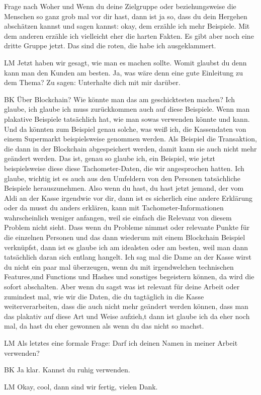 \begin{xlist}
Frage nach Woher und Wenn du deine Zielgruppe oder beziehungsweise die Menschen so ganz grob mal vor dir hast, dann ist ja so, dass du dein Hergehen abschätzen kannst und sagen kannst: okay, dem erzähle ich mehr Beispiele. Mit dem anderen erzähle ich vielleicht eher die harten Fakten. Es gibt aber noch eine dritte Gruppe jetzt. Das sind die roten, die habe ich ausgeklammert.
    \item[LM] Jetzt haben wir gesagt, wie man es machen sollte. Womit glaubst du denn kann man den Kunden am besten. Ja, was wäre denn eine gute Einleitung zu dem Thema? Zu sagen: Unterhalte dich mit mir darüber.
    \item[BK] Über Blockchain? Wie könnte man das am geschicktesten machen? Ich glaube, ich glaube ich muss zurückkommen auch auf diese Beispiele. Wenn man plakative Beispiele tatsächlich hat, wie man sowas verwenden könnte und kann. Und da könnten zum Beispiel genau solche, was weiß ich, die Kassendaten von einem Supermarkt beispielsweise genommen werden. Als Beispiel die Transaktion, die dann in der Blockchain abgespeichert werden, damit kann sie auch nicht mehr geändert werden. Das ist, genau so glaube ich, ein Beispiel, wie jetzt beispielsweise diese diese Tachometer-Daten, die wir angesprochen hatten. Ich glaube, wichtig ist es auch aus den Umfeldern von den Personen tatsächliche Beispiele herauszunehmen. Also wenn du hast, du hast jetzt jemand, der vom Aldi an der Kasse irgendwie vor dir, dann ist es sicherlich eine andere Erklärung oder da musst du anders erklären, kann mit Tachometer-Informationen wahrscheinlich weniger anfangen, weil sie einfach die Relevanz von diesem Problem nicht sieht. Dass wenn du Probleme nimmst oder relevante Punkte für die einzelnen Personen und das dann wiederum mit einem Blockchain Beispiel verknüpfst, dann ist es glaube ich am idealsten oder am besten, weil man dann tatsächlich daran sich entlang hangelt. Ich sag mal die Dame an der Kasse wirst du nicht ein paar mal überzeugen, wenn du mit irgendwelchen technischen Features,und Functions und Hashes und sonstiges begeistern können, da wird die sofort abschalten. Aber wenn du sagst was ist relevant für deine Arbeit oder zumindest mal, wie wir die Daten, die du tagtäglich in die Kasse weiterverarbeiten, dass die auch nicht mehr geändert werden können, dass man das plakativ auf diese Art und Weise aufzieh,t dann ist glaube ich da eher noch mal, da hast du eher gewonnen als wenn du das nicht so machst. 
\item[LM] Als letztes eine formale Frage: Darf ich deinen Namen in meiner Arbeit verwenden?
\item[BK] Ja klar. Kannst du ruhig verwenden. 
\item[LM] Okay, cool, dann sind wir fertig, vielen Dank. 

\end{xlist}


